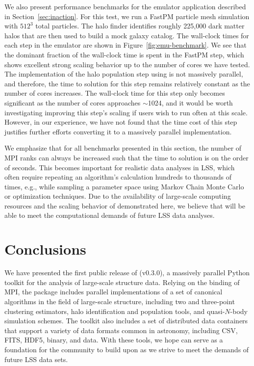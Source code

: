 We also present performance benchmarks for the emulator application
described in Section~\ref{sec:inaction}.
For this test, we run a FastPM particle mesh simulation with $512^3$ total
particles. The halo finder
identifies roughly 225,000 dark matter halos that are then used to build a
mock galaxy catalog. The wall-clock times for
each step in the emulator are shown in Figure~\ref{fig:emu-benchmark}.
We see that the dominant fraction of the
wall-clock time is spent in the FastPM step, which
shows excellent strong scaling behavior up to the number of cores we
have tested. The implementation of the halo population step using
\halotools{} is not massively parallel, and therefore,
the time to solution for this step remains relatively constant as the
number of cores increases. The wall-clock time for this step only
becomes significant as the number of cores approaches $\sim$1024, and
it would be worth investigating improving this step's scaling if
users wish to run often at this scale. However, in our experience, we have
not found that the time cost of this step justifies
further efforts converting it to a massively parallel implementation.

We emphasize that for all benchmarks presented in this section, the number of
MPI ranks can always be increased such that the time to solution is on the
order of seconds. This becomes important for realistic data analyses in LSS,
which often require repeating an algorithm's calculation hundreds to thousands
of times, e.g., while sampling a parameter space using
Markov Chain Monte Carlo or optimization techniques. Due to the availability of large-scale
computing resources and the scaling behavior of \nbkit{} demonstrated here,
we believe that \nbkit{} will be able to meet the computational demands of
future LSS data analyses.

\section{Conclusions}
\label{sec:conclusions}

We have presented the first public release of \nbkit{} (v0.3.0), a massively
parallel Python toolkit for the analysis of large-scale structure
data. Relying on the \mpipy{} binding of MPI, the package
includes parallel implementations of a set of canonical algorithms
in the field of large-scale structure, including two and three-point
clustering estimators, halo identification and population tools, and
quasi-$N$-body simulation schemes. The toolkit also includes a set of
distributed data containers that support a variety of data formats
common in astronomy, including CSV, FITS, HDF5, binary, and \bigfile{} data.
With these tools, we hope \nbkit{} can serve as a foundation for the community
to build upon as we strive to meet the demands of future LSS data sets.

